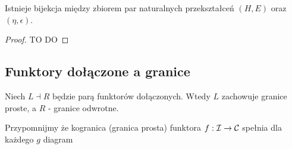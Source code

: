 \begin{theorem}{}{}
  Istnieje bijekcja między zbiorem par naturalnych przekształceń $(H, E)$ oraz $(\eta, \epsilon)$.
\end{theorem}

\begin{proof}
  \color{red}TO DO
\end{proof}

\subsection{Funktory dołączone a granice}

\begin{theorem}{}{}
  Niech $L\dashv R$ będzie parą funktorów dołączonych. Wtedy $L$ zachowuje granice proste, a $R$ - granice odwrotne.
\end{theorem}

Przypomnijmy że kogranica (granica prosta) funktora $f:\mathcal{I}\to\mathcal{C}$ spełnia dla każdego $g$ diagram
\begin{center}
\end{center}

